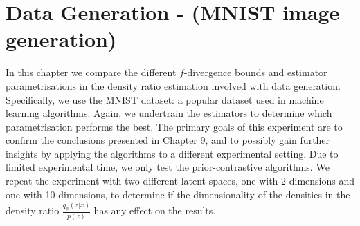 \documentclass[honours,12pt]{unswthesis}
\numberwithin{equation}{section}
\theoremstyle{definition}
\begin{document}
\chapter{Data Generation - (MNIST image generation)}
In this chapter we compare the different $f$-divergence bounds and estimator parametrisations in the density ratio estimation involved with data generation. Specifically, we use the MNIST dataset: a popular dataset used in machine learning algorithms. Again, we undertrain the estimators to determine which parametrisation performs the best. The primary goals of this experiment are to confirm the conclusions presented in Chapter 9, and to possibly gain further insights by applying the algorithms to a different experimental setting. Due to limited experimental time, we only test the prior-contrastive algorithms. We repeat the experiment with two different latent spaces, one with 2 dimensions and one with 10 dimensions, to determine if the dimensionality of the densities in the density ratio $\frac{q_\phi(z|x)}{p(z)}$ has any effect on the results.
\end{document}
